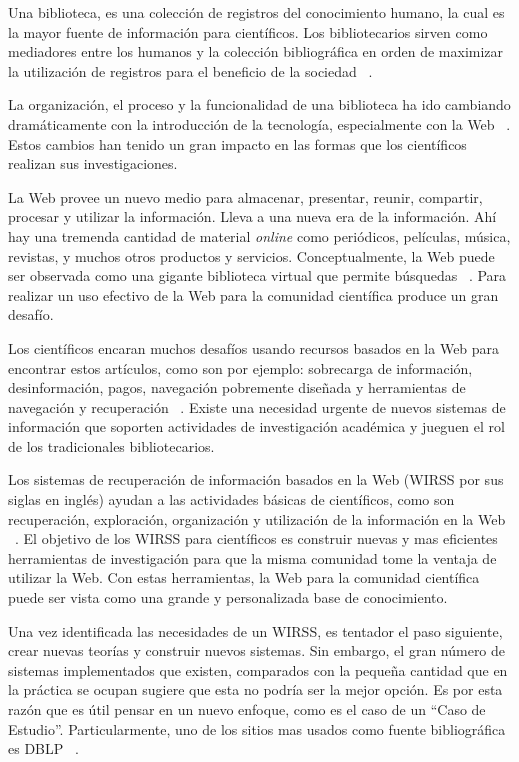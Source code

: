 \documentclass[12pt,oneside,letterpaper]{book}
\newcommand{\eng}[1]{\textit{#1}\xspace}			%
\newcommand{\abr}[1]{\textsc{#1}\xspace}           %
\theoremstyle{definition}
\begin{document}
Una biblioteca, es una colección de registros del conocimiento humano, la cual es la mayor fuente de información para científicos. Los bibliotecarios sirven como mediadores entre los humanos y la colección bibliográfica en orden de maximizar la utilización de registros para el beneficio de la sociedad ~\cite{marsterson1986}.

La organización, el proceso y la funcionalidad de una biblioteca ha ido cambiando dramáticamente con la introducción de la tecnología, especialmente con la Web ~\cite{saunders1993}. Estos cambios han tenido un gran impacto en las formas que los científicos realizan sus investigaciones.

La Web provee un nuevo medio para almacenar, presentar, reunir, compartir, procesar y utilizar la información. Lleva a una nueva era de la información. Ahí hay una tremenda cantidad de material \eng{online} como periódicos, películas, música, revistas, y muchos otros productos y servicios. Conceptualmente, la Web puede ser observada como una gigante biblioteca virtual que permite búsquedas ~\cite{saunders1993}. Para realizar un uso efectivo de la Web para la comunidad científica produce un gran desafío.

Los científicos encaran muchos desafíos usando recursos basados en la Web para encontrar estos artículos, como son por ejemplo: sobrecarga de información, desinformación, pagos, navegación pobremente diseñada y herramientas de navegación y recuperación ~\cite{hoggan2002}. Existe una necesidad urgente de nuevos sistemas de información que soporten actividades de investigación académica y jueguen el rol de los tradicionales bibliotecarios.

Los sistemas de recuperación de información basados en la Web (\abr{WIRSS} por sus siglas en inglés) ayudan a las actividades básicas de científicos, como son recuperación, exploración, organización y utilización de la información en la Web ~\cite{yao2003web,yao2002information}. El objetivo de los \abr{WIRSS} para científicos es construir nuevas y mas eficientes herramientas de investigación para que la misma comunidad tome la ventaja de utilizar la Web. Con estas herramientas, la Web para la comunidad científica puede ser vista como una grande y personalizada base de conocimiento.

Una vez identificada las necesidades de un \abr{WIRSS}, es tentador el paso siguiente, crear nuevas teorías y construir nuevos sistemas. Sin embargo, el gran número de sistemas implementados que existen, comparados con la pequeña cantidad que en la práctica se ocupan sugiere que esta no podría ser la mejor opción. Es por esta razón que es útil pensar en un nuevo enfoque, como es el caso de un ``Caso de Estudio''. Particularmente, uno de los sitios mas usados como fuente bibliográfica es \abr{DBLP} ~\cite{yin2013case}.  
\end{document}
